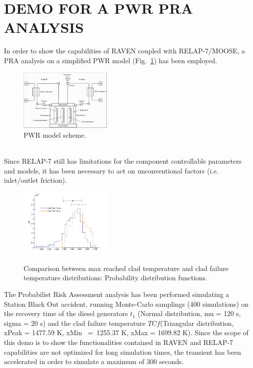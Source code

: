 \documentclass{anstrans}
\begin{document}
\section{DEMO FOR A PWR PRA ANALYSIS}
In order to show the capabilities of RAVEN coupled with RELAP-7/MOOSE, a PRA analysis on a simplified PWR model (Fig.~\ref{fig:PWRmodel}) has been employed.
\begin{figure}
   \centering
    \includegraphics[width=0.4\textwidth]{figures/PWR_TMI_SCHEME.PNG}
    \caption{PWR model scheme.}
    \label{fig:PWRmodel}
\end{figure}
\\Since RELAP-7 still has limitations for the component controllable parameters and models, it has been necessary to act on unconventional factors (i.e. inlet/outlet friction).
\begin{figure} [H]
\centering
  \centering
  \includegraphics[width=0.4\textwidth]{figures/PRA_dist2.png}
  \label{fig:pdf_temp}
   \caption{Comparison between max reached clad temperature and clad failure temperature distributions: Probability distribution functions.}
\label{fig:distributionResults}
\end{figure}
The Probabilist Risk Assessment analysis has been performed simulating a Station Black Out accident, running Monte-Carlo samplings (400 simulations) on the recovery time of the diesel generators $t_{1}$ (Normal distribution, mu = 120 s, sigma = 20 s) and the clad failure temperature $TC{f}$(Triangular distribution, xPeak = 1477.59 K, xMin~ =~1255.37 K, xMax = 1699.82 K). Since the scope of this demo is to show the functionalities contained in RAVEN and RELAP-7 capabilities are not optimized for long simulation times, the transient has been accelerated in order to simulate a maximum of 300 seconds. 
\end{document}
